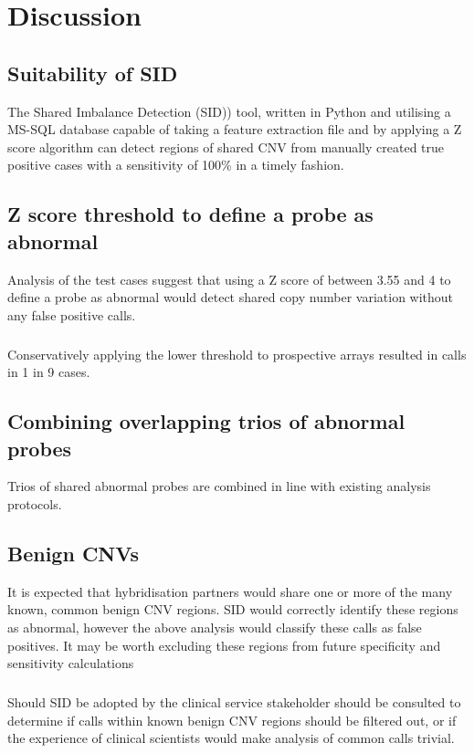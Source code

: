 \chapter{Discussion}\label{ch:Discussion} 
\section{Suitability of SID}
The Shared Imbalance Detection (SID)) tool, written in Python and utilising a MS-SQL database capable of taking a feature extraction file and by applying a Z score algorithm can detect regions of shared CNV from manually created true positive cases with a sensitivity of 100\% in a timely fashion.


\section{Z score threshold to define a probe as abnormal}
Analysis of the test cases suggest that using a Z score of between 3.55 and 4 to define a probe as abnormal would detect shared copy number variation without any false positive calls. 

\paragraph*{}
Conservatively applying the lower threshold to prospective arrays resulted in calls in 1 in 9 cases. 

\section{Combining overlapping trios of abnormal probes}
Trios of shared abnormal probes are combined in line with existing analysis protocols.

\section{Benign CNVs}
It is expected that hybridisation partners would share one or more of the many known, common benign CNV regions. SID would correctly identify these regions as abnormal, however the above analysis would classify these calls as false positives. It may be worth excluding these regions from future specificity and sensitivity calculations
\paragraph*{}
Should SID be adopted by the clinical service stakeholder should be consulted to determine if calls within known benign CNV regions should be filtered out, or  if the experience of clinical scientists would make analysis of common calls trivial.



